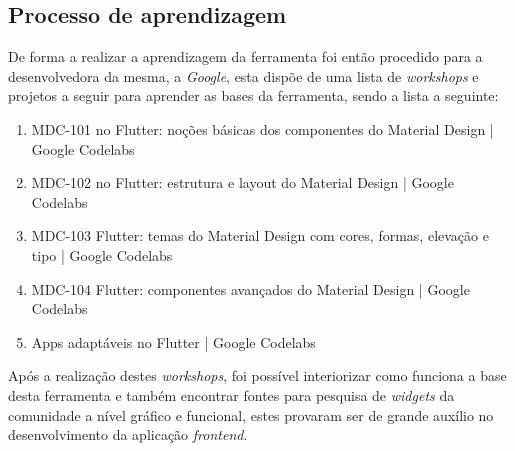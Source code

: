 \subsection{Processo de aprendizagem}
De forma a realizar a aprendizagem da ferramenta foi então procedido para a desenvolvedora da mesma, a \textit{Google}, esta dispõe de uma lista de \textit{workshops} e projetos a seguir para aprender as bases da ferramenta, sendo a lista a seguinte:

\begin{enumerate}
 \item MDC-101 no Flutter: noções básicas dos componentes do Material Design | Google Codelabs
 \item MDC-102 no Flutter: estrutura e layout do Material Design | Google Codelabs
 \item MDC-103 Flutter: temas do Material Design com cores, formas, elevação e tipo | Google Codelabs
 \item MDC-104 Flutter: componentes avançados do Material Design | Google Codelabs
 \item Apps adaptáveis no Flutter | Google Codelabs
\end{enumerate}

Após a realização destes \textit{workshops}, foi possível interiorizar como funciona a base desta ferramenta e também encontrar fontes para pesquisa de \textit{widgets} da comunidade a nível gráfico e funcional, estes provaram ser de grande auxílio no desenvolvimento da aplicação \textit{frontend}.